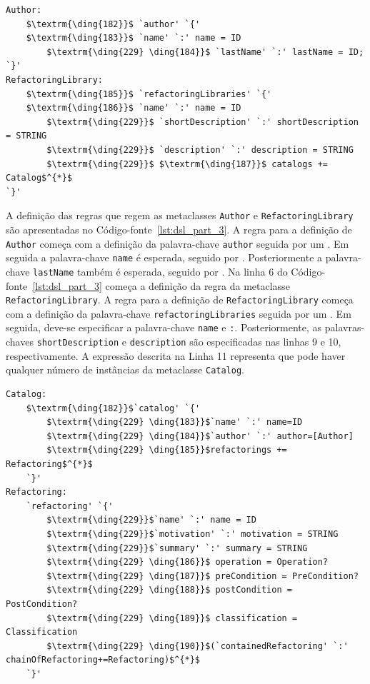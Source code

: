\begin{lstlisting}[language=Xtext, frame=single, basicstyle=\scriptsize, mathescape=true, label={lst:dsl_part_3}, caption={Gramática da DSL - parte 3}]
Author:
	$\textrm{\ding{182}}$ `author' `{'
	$\textrm{\ding{183}}$ `name' `:' name = ID  
		$\textrm{\ding{229} \ding{184}}$ `lastName' `:' lastName = ID; 
`}'
RefactoringLibrary:
	$\textrm{\ding{185}}$ `refactoringLibraries' `{'
	$\textrm{\ding{186}}$ `name' `:' name = ID  
		$\textrm{\ding{229}}$ `shortDescription' `:' shortDescription = STRING
		$\textrm{\ding{229}}$ `description' `:' description = STRING
		$\textrm{\ding{229}}$ $\textrm{\ding{187}}$ catalogs += Catalog$^{*}$
`}'
\end{lstlisting}

A definição das regras que regem as metaclasses \texttt{Author} e \texttt{RefactoringLibrary} são apresentadas no Código-fonte~\ref{lst:dsl_part_3}. A regra para a definição de \texttt{Author} começa com a definição da palavra-chave \texttt{author} seguida por um \aspas{\{}. Em seguida a palavra-chave \texttt{name} é esperada, seguido por \aspas{\texttt{:}} . Posteriormente a palavra-chave \texttt{lastName} também é esperada, seguido por \aspas{\texttt{:}} . Na linha 6 do Código-fonte~\ref{lst:dsl_part_3} começa a definição da regra da metaclasse \texttt{RefactoringLibrary}. A regra para a definição de \texttt{RefactoringLibrary} começa com a definição da palavra-chave \texttt{refactoringLibraries} seguida por um \aspas{\{}. Em seguida, deve-se especificar a palavra-chave \texttt{name} e \texttt{:}. Posteriormente, as palavras-chaves \texttt{shortDescription} e \texttt{description} são especificadas nas linhas 9 e 10, respectivamente. A expressão descrita na Linha 11 representa que pode haver qualquer número de instâncias da metaclasse \texttt{Catalog}.

\begin{lstlisting}[language=Xtext, frame=single, basicstyle=\scriptsize, mathescape=true, label={lst:dsl_part_4}, caption={Gramática da DSL - parte 4}]
Catalog:
	$\textrm{\ding{182}}$`catalog' `{' 
		$\textrm{\ding{229} \ding{183}}$`name' `:' name=ID
		$\textrm{\ding{229} \ding{184}}$`author' `:' author=[Author]
		$\textrm{\ding{229} \ding{185}}$refactorings += Refactoring$^{*}$
	`}'
Refactoring:
	`refactoring' `{' 
		$\textrm{\ding{229}}$`name' `:' name = ID
		$\textrm{\ding{229}}$`motivation' `:' motivation = STRING
		$\textrm{\ding{229}}$`summary' `:' summary = STRING
		$\textrm{\ding{229} \ding{186}}$ operation = Operation?
		$\textrm{\ding{229} \ding{187}}$ preCondition = PreCondition?
		$\textrm{\ding{229} \ding{188}}$ postCondition = PostCondition?
		$\textrm{\ding{229} \ding{189}}$ classification = Classification
		$\textrm{\ding{229} \ding{190}}$(`containedRefactoring' `:' chainOfRefactoring+=Refactoring)$^{*}$
	`}'
\end{lstlisting}

